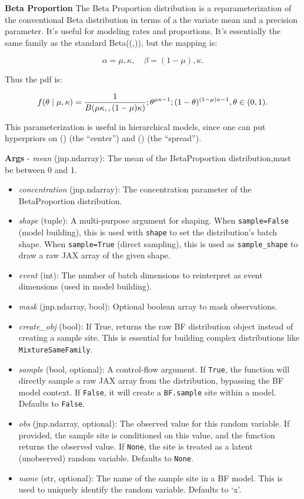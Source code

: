 \documentclass[
  letterpaper,
  DIV=11,
  numbers=noendperiod]{scrartcl}
\begin{document}
\textbf{Beta Proportion} The Beta Proportion distribution is a
reparameterization of the conventional Beta distribution in terms of a
the variate mean and a precision parameter. It's useful for modeling
rates and proportions. It's essentially the same family as the standard
Beta((\alpha,\beta)), but the mapping is:

\[
\alpha = \mu , \kappa,\quad \beta = (1 - \mu), \kappa.
\]

Thus the pdf is:

\[
f(\theta \mid \mu, \kappa) = \frac{1}{B(\mu\kappa,,(1-\mu)\kappa)} ; \theta^{\mu\kappa - 1} ; (1 - \theta)^{(1 - \mu)\kappa         - 1}, \\
\theta \in (0,1). 
\]

This parameterization is useful in hierarchical models, since one can
put hyperpriors on (\mu) (the ``center'') and (\kappa) (the ``spread'').

\textbf{Args} - \emph{mean} (jnp.ndarray): The mean of the
BetaProportion distribution,must be between 0 and 1.

\begin{itemize}
\item
  \emph{concentration} (jnp.ndarray): The concentration parameter of the
  BetaProportion distribution.
\item
  \emph{shape} (tuple): A multi-purpose argument for shaping. When
  \texttt{sample=False} (model building), this is used with
  \texttt{shape} to set the distribution's batch shape. When
  \texttt{sample=True} (direct sampling), this is used as
  \texttt{sample\_shape} to draw a raw JAX array of the given shape.
\item
  \emph{event} (int): The number of batch dimensions to reinterpret as
  event dimensions (used in model building).
\item
  \emph{mask} (jnp.ndarray, bool): Optional boolean array to mask
  observations.
\item
  \emph{create\_obj} (bool): If True, returns the raw BF distribution
  object instead of creating a sample site. This is essential for
  building complex distributions like \texttt{MixtureSameFamily}.
\item
  \emph{sample} (bool, optional): A control-flow argument. If
  \texttt{True}, the function will directly sample a raw JAX array from
  the distribution, bypassing the BF model context. If \texttt{False},
  it will create a \texttt{BF.sample} site within a model. Defaults to
  \texttt{False}.
\item
  \emph{obs} (jnp.ndarray, optional): The observed value for this random
  variable. If provided, the sample site is conditioned on this value,
  and the function returns the observed value. If \texttt{None}, the
  site is treated as a latent (unobserved) random variable. Defaults to
  \texttt{None}.
\item
  \emph{name} (str, optional): The name of the sample site in a BF
  model. This is used to uniquely identify the random variable. Defaults
  to `x'.
\end{itemize}
\end{document}
